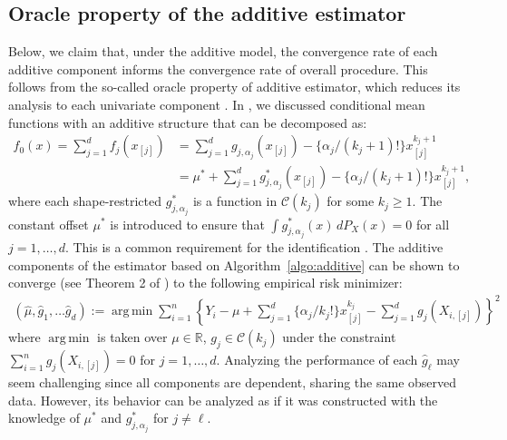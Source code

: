 \documentclass[12pt]{article}
\DeclareMathOperator*{\argmin}{arg\,min}
\begin{document}
\begin{appendices}
\subsection{Oracle property of the additive estimator}\label{suppsec:oracle-additive}
Below, we claim that, under the additive model, the convergence rate of each additive component informs the convergence rate of overall procedure. This follows from the so-called oracle property of additive estimator, which reduces its analysis to each univariate component \citep{mammen2007additive, guntuboyina2018nonparametric}. In , we discussed conditional mean functions with an additive structure that can be decomposed as: 
\begin{align*}
    f_0(x) = \sum_{j=1}^d f_j(x_{[j]}) &= \sum_{j=1}^d g_{j, \alpha_j}(x_{[j]}) -  \{\alpha_j/(k_j+1)!\} x_{[j]}^{k_j+1}\\
    &= \mu^* + \sum_{j=1}^d  g^*_{j, \alpha_j}(x_{[j]}) - \{\alpha_j/(k_j+1)!\} x_{[j]}^{k_j+1},
\end{align*}
where each shape-restricted $g_{j,\alpha_j}^*$ is a function in $\mathcal{C}(k_j)$ for some $k_j \geq 1$. The constant offset $\mu^*$ is introduced to ensure that $\int  g^*_{j, \alpha_j}(x)\, dP_X(x)=0$ for all $j = 1, \ldots, d$. This is a common requirement for the identification \citep{mammen2007additive}. The additive components of the estimator based on Algorithm~\ref{algo:additive} can be shown to converge (see Theorem 2 of \cite{mammen2007additive}) to the following empirical risk minimizer:
\begin{align*}
    (\widehat \mu,  \widehat g_1, \ldots \widehat g_d) := \argmin\sum_{i=1}^n\left\{Y_i-\mu+\sum_{j =1}^d\{\alpha_j/k_j!\} x_{[j]}^{k_j}-\sum_{j =1}^d g_{j}(X_{i,[j]})\right\}^2
\end{align*}
where $\argmin$ is taken over $\mu \in \mathbb{R}$, $g_{j}\in \mathcal{C}(k_j)$ under the constraint $\sum_{i=1}^n g_j(X_{i,[j]}) = 0$ for $j = 1, \ldots, d$. Analyzing the performance of each $\widehat g_\ell$ may seem challenging since all components are dependent, sharing the same observed data. However, its behavior can be analyzed as if it was constructed with the knowledge of $\mu^*$ and $g_{j,\alpha_j}^*$ for $j \neq \ell$. 


\end{appendices}
\end{document}
